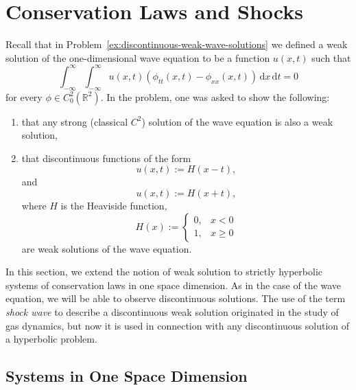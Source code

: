 \section{Conservation Laws and Shocks}\label{chap:conservation-laws-shocks}\label{chap:local-existence}

Recall that in Problem~\ref{ex:discontinuous-weak-wave-solutions} we defined a weak solution of the one-dimensional wave equation to be a function $u(x,t)$ such that
\begin{equation}\label{eq:conservation-intro-weak-wave}
\int_{-\infty}^{\infty}\int_{-\infty}^{\infty}u(x,t)(\phi_{tt}(x,t)-\phi_{xx}(x,t))\,\mathrm{d}x\,\mathrm{d}t=0
\end{equation}
for every $\phi\in C_0^2(\mathbb{R}^2)$. In the problem, one was asked to show the following:
\begin{enumerate}
\item that any strong (classical $C^2$) solution of the wave equation is also a weak solution,
\item that discontinuous functions of the form
\begin{equation}\label{eq:conservation-intro-right-step}
u(x,t):=H(x-t),
\end{equation}
and
\begin{equation}\label{eq:conservation-intro-left-step}
u(x,t):=H(x+t),
\end{equation}
where $H$ is the Heaviside function,
\begin{equation}\label{eq:conservation-intro-heaviside}
H(x):=\begin{cases}0,&x<0\\1,&x\geq0\end{cases}
\end{equation}
are weak solutions of the wave equation.\end{enumerate}

In this section, we extend the notion of weak solution to strictly hyperbolic systems of conservation laws in one space dimension. As in the case of the wave equation, we will be able to observe discontinuous solutions. The use of the term \emph{shock wave} to describe a discontinuous weak solution originated in the study of gas dynamics, but now it is used in connection with any discontinuous solution of a hyperbolic problem.

\subsection{Systems in One Space Dimension}\label{sec:one-dimensional-conservation-systems}

